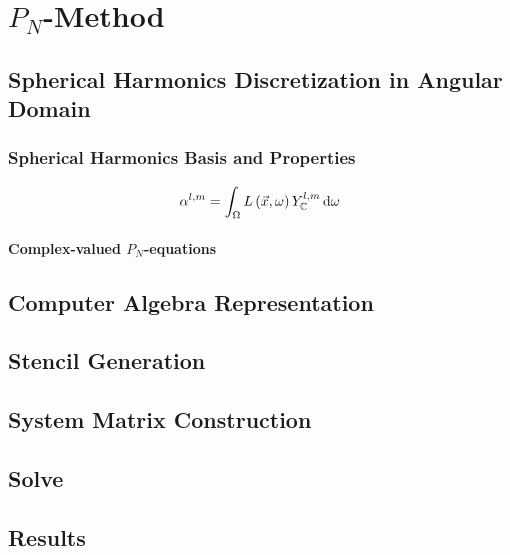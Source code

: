 \chapter{$P_N$-Method}
%
\label{sec:pnmethod}


\section{Spherical Harmonics Discretization in Angular Domain}
\subsection{Spherical Harmonics Basis and Properties}


\begin{align}
\label{eq:sh_projection}
\alpha^{l,m} = \int_\Omega{ L\left(\vec{x},\omega\right)Y_{\mathbb{C}}^{l,m}\,\mathrm{d}\omega}
\end{align}

\subsubsection{Complex-valued $P_N$-equations}

\section{Computer Algebra Representation}




\section{Stencil Generation}
\section{System Matrix Construction}
\section{Solve}
\section{Results}
